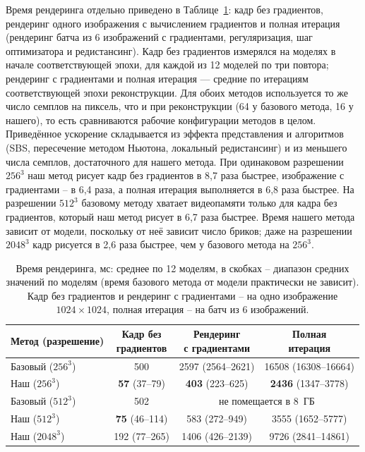 Время рендеринга отдельно приведено в Таблице~\ref{tab:render_time}: кадр без градиентов, рендеринг одного изображения с вычислением градиентов и полная итерация (рендеринг батча из 6 изображений с градиентами, регуляризация, шаг оптимизатора и редистансинг). Кадр без градиентов измерялся на моделях в начале соответствующей эпохи, для каждой из 12 моделей по три повтора; рендеринг с градиентами и полная итерация --- средние по итерациям соответствующей эпохи реконструкции. Для обоих методов используется то же число семплов на пиксель, что и при реконструкции (64 у базового метода, 16 у нашего), то есть сравниваются рабочие конфигурации методов в целом. Приведённое ускорение складывается из эффекта представления и алгоритмов (SBS, пересечение методом Ньютона, локальный редистансинг) и из меньшего числа семплов, достаточного для нашего метода. При одинаковом разрешении $256^3$ наш метод рисует кадр без градиентов в 8,7 раза быстрее, изображение с градиентами -- в 6,4 раза, а полная итерация выполняется в 6,8 раза быстрее. На разрешении $512^3$ базовому методу хватает видеопамяти только для кадра без градиентов, который наш метод рисует в 6,7 раза быстрее. Время нашего метода зависит от модели, поскольку от неё зависит число бриков; даже на разрешении $2048^3$ кадр рисуется в 2,6 раза быстрее, чем у базового метода на $256^3$.

\begin{table}[ht]
    \centering
    \small
    \setlength{\tabcolsep}{4pt}
    \caption{Время рендеринга, мс: среднее по 12 моделям, в скобках -- диапазон средних значений по моделям (время базового метода от модели практически не зависит). Кадр без градиентов и рендеринг с градиентами -- на одно изображение $1024\times1024$, полная итерация -- на батч из 6 изображений.}
    \label{tab:render_time}
    \begin{tabular}{lccc}
        \toprule
        Метод (разрешение) & \makecell{Кадр без\\градиентов} & \makecell{Рендеринг\\с градиентами} & \makecell{Полная\\итерация} \\
        \midrule
        Базовый ($256^3$) & 500 & 2597 (2564--2621) & 16508 (16308--16664) \\
        Наш ($256^3$) & \textbf{57} (37--79) & \textbf{403} (223--625) & \textbf{2436} (1347--3778) \\
        \midrule
        Базовый ($512^3$) & 502 & \multicolumn{2}{c}{не помещается в 8~ГБ} \\
        Наш ($512^3$) & \textbf{75} (46--114) & 583 (272--949) & 3555 (1652--5777) \\
        \midrule
        Наш ($2048^3$) & 192 (77--265) & 1406 (426--2139) & 9726 (2841--14861) \\
        \bottomrule
    \end{tabular}
\end{table}

